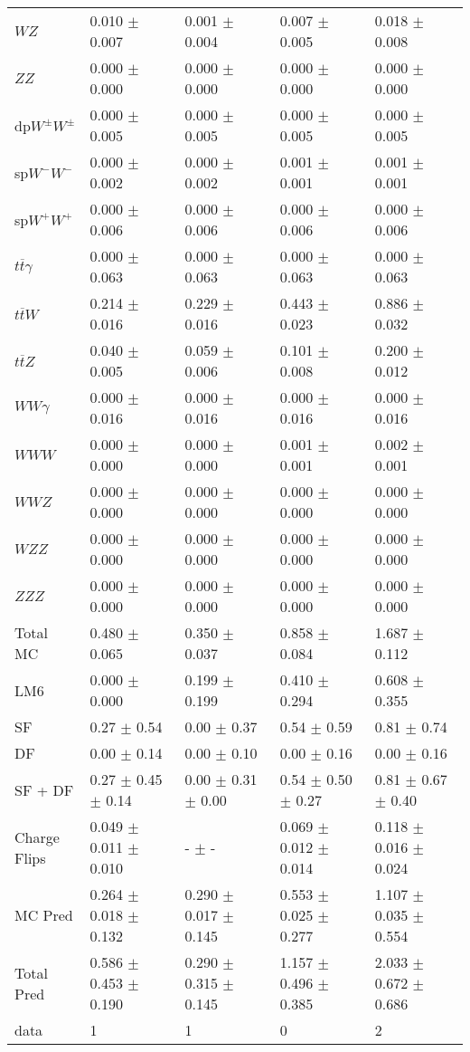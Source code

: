 \begin{tabular}{l | l l l l}
$WZ$ &  0.010 $\pm$  0.007 &  0.001 $\pm$  0.004 &  0.007 $\pm$  0.005 &  0.018 $\pm$  0.008\\
$ZZ$ &  0.000 $\pm$   0.000 &  0.000 $\pm$   0.000 &   0.000 $\pm$   0.000 &   0.000 $\pm$   0.000\\
\hline
dp$W^{\pm}W^{\pm}$ &  0.000 $\pm$  0.005 &  0.000 $\pm$  0.005 &  0.000 $\pm$  0.005 &  0.000 $\pm$  0.005\\
sp$W^{-}W^{-}$ &  0.000 $\pm$  0.002 &  0.000 $\pm$  0.002 &  0.001 $\pm$  0.001 &  0.001 $\pm$  0.001\\
sp$W^{+}W^{+}$ &  0.000 $\pm$  0.006 &  0.000 $\pm$  0.006 &  0.000 $\pm$  0.006 &  0.000 $\pm$  0.006\\
$t\overline{t}\gamma$ &  0.000 $\pm$  0.063 &  0.000 $\pm$  0.063 &  0.000 $\pm$  0.063 &  0.000 $\pm$  0.063\\
$t\overline{t}W$ &  0.214 $\pm$  0.016 &  0.229 $\pm$  0.016 &  0.443 $\pm$  0.023 &  0.886 $\pm$  0.032\\
$t\overline{t}Z$ &  0.040 $\pm$  0.005 &  0.059 $\pm$  0.006 &  0.101 $\pm$  0.008 &  0.200 $\pm$  0.012\\
$WW\gamma$ &  0.000 $\pm$  0.016 &  0.000 $\pm$  0.016 &  0.000 $\pm$  0.016 &  0.000 $\pm$  0.016\\
$WWW$ &   0.000 $\pm$   0.000 &   0.000 $\pm$   0.000 &  0.001 $\pm$  0.001 &  0.002 $\pm$  0.001\\
$WWZ$ &  0.000 $\pm$   0.000 &  0.000 $\pm$   0.000 &  0.000 $\pm$   0.000 &  0.000 $\pm$   0.000\\
$WZZ$ &   0.000 $\pm$   0.000 &  0.000 $\pm$   0.000 &   0.000 $\pm$   0.000 &   0.000 $\pm$   0.000\\
$ZZZ$ &  0.000 $\pm$   0.000 &   0.000 $\pm$   0.000 &   0.000 $\pm$   0.000 &   0.000 $\pm$   0.000\\
\hline
Total MC &  0.480 $\pm$  0.065 &  0.350 $\pm$  0.037 &  0.858 $\pm$  0.084 &  1.687 $\pm$  0.112\\
\hline\hline
\hline
LM6 &  0.000 $\pm$  0.000 &  0.199 $\pm$  0.199 &  0.410 $\pm$  0.294 &  0.608 $\pm$  0.355\\
\hline\hline
\hline\hline
 SF  & 0.27 $\pm$ 0.54 & 0.00 $\pm$ 0.37 & 0.54 $\pm$ 0.59 & 0.81 $\pm$ 0.74\\
 DF  & 0.00 $\pm$ 0.14 & 0.00 $\pm$ 0.10 & 0.00 $\pm$ 0.16 & 0.00 $\pm$ 0.16\\
\hline
 SF + DF  & 0.27 $\pm$ 0.45 $\pm$ 0.14 & 0.00 $\pm$ 0.31 $\pm$ 0.00 & 0.54 $\pm$ 0.50 $\pm$ 0.27 & 0.81 $\pm$ 0.67 $\pm$ 0.40\\
\hline\hline
Charge Flips & 0.049 $\pm$ 0.011 $\pm$ 0.010 & - $\pm$ - & 0.069 $\pm$ 0.012 $\pm$ 0.014 & 0.118 $\pm$ 0.016 $\pm$ 0.024\\
\hline\hline
\hline
MC Pred &  0.264 $\pm$  0.018 $\pm$  0.132 &  0.290 $\pm$  0.017 $\pm$  0.145 &  0.553 $\pm$  0.025 $\pm$  0.277 &  1.107 $\pm$  0.035 $\pm$  0.554\\
\hline\hline
Total Pred &  0.586 $\pm$  0.453 $\pm$  0.190 &  0.290 $\pm$  0.315 $\pm$  0.145 &  1.157 $\pm$  0.496 $\pm$  0.385 &  2.033 $\pm$  0.672 $\pm$  0.686\\
\hline\hline
data & 1 & 1 & 0 & 2\\
\hline\hline
\end{tabular}
